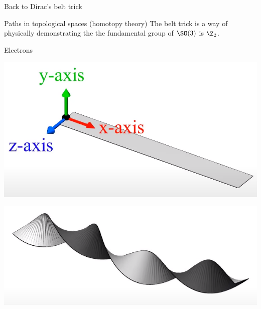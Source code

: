 \documentclass[10pt]{beamer}
\begin{document}
\begin{frame}{Back to Dirac's belt trick}

\end{frame}

\begin{frame}{Paths in topological spaces (homotopy theory)}
  The belt trick is a way of physically demonstrating the the fundamental group of $\SO(3)$ is $\Z_2$.
\end{frame}


\begin{frame}{Electrons}
\end{frame}

\begin{frame}

    

    \includegraphics[scale=0.1]{Pictures/beltaxis.png}

    \includegraphics[scale=0.1]{Pictures/4pibelt.png}


\end{frame}
\end{document}
